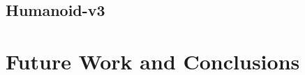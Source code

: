 \documentclass[conference]{IEEEtran}
\begin{document}
\blindtext

\subsection{Humanoid-v3}

\blindtext

\section{Future Work and Conclusions}

\blindtext[2]




\end{document}
